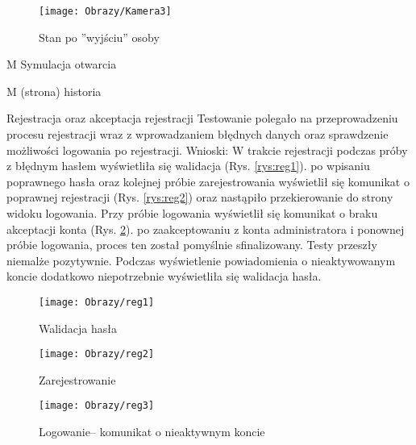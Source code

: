 \begin{enumerate*}
	\begin{figure}[ht!]
		\vspace{-1.7cm}
		\centering
		\texttt{[image: Obrazy/Kamera3]}
		\caption{Stan po ''wyjściu'' osoby}
		\label{rys:Kamera3}
	\end{figure}
\newpage
	\item M Symulacja otwarcia
	\item M (strona) historia
	\item Rejestracja oraz akceptacja rejestracji
	Testowanie polegało na przeprowadzeniu procesu rejestracji wraz z wprowadzaniem błędnych danych oraz sprawdzenie możliwości logowania po rejestracji.
	Wnioski: W trakcie rejestracji podczas próby z błędnym hasłem wyświetliła się walidacja (Rys. \ref{rys:reg1}). po wpisaniu poprawnego hasła oraz kolejnej próbie zarejestrowania wyświetlił się komunikat o poprawnej rejestracji (Rys. \ref{rys:reg2}) oraz nastąpiło przekierowanie do strony widoku logowania. Przy próbie logowania wyświetlił się komunikat o braku akceptacji konta (Rys. \ref{rys:reg3}). po zaakceptowaniu z konta administratora i ponownej próbie logowania, proces ten został pomyślnie sfinalizowany. Testy przeszły niemalże pozytywnie. Podczas wyświetlenie powiadomienia o nieaktywowanym koncie dodatkowo niepotrzebnie wyświetliła się walidacja hasła.   
	
		\begin{figure}[ht!]
		\centering
		\begin{minipage}{0.3\textwidth}
			\texttt{[image: Obrazy/reg1]}
			\caption{Walidacja hasła }
			\label{rys:reg1}
		\end{minipage}
	\hspace{0.05\textwidth}
		\begin{minipage}{0.3\textwidth}
			\texttt{[image: Obrazy/reg2]}
			\caption{Zarejestrowanie}
			\label{rys:reg2}
		\end{minipage}
		\hspace{0.05\textwidth}
		\begin{minipage}{0.3\textwidth}
			\texttt{[image: Obrazy/reg3]}
			\caption{Logowanie-- komunikat o nieaktywnym koncie}
			\label{rys:reg3}
		\end{minipage}

	\end{figure}


\end{enumerate*}

